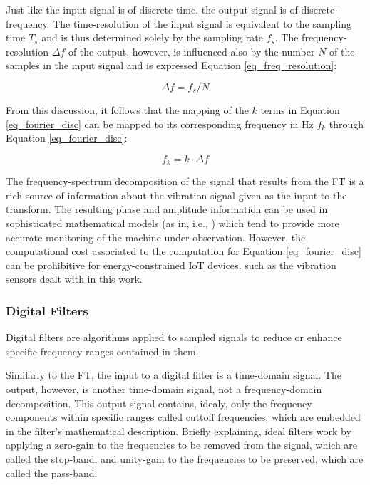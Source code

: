 \documentclass[conference]{IEEEtran}
\begin{document}
Just like the input signal is of discrete-time, the output signal is of discrete-frequency. The time-resolution of the input signal is equivalent to the sampling time $T_{s}$ and is thus determined solely by the sampling rate $f_{s}$. The frequency-resolution $\Delta f$ of the output, however, is influenced also by the number $N$ of the samples in the input signal and is expressed Equation \ref{eq_freq_resolution}:

\begin{equation}
\label{eq_freq_resolution}
\Delta f = f_{s}/N
\end{equation}

From this discussion, it follows that the mapping of the $k$ terms in Equation \ref{eq_fourier_disc} can be mapped to its corresponding frequency in Hz $f_{k}$ through Equation \ref{eq_fourier_disc}:

\begin{equation}
\label{eq_freq_resolution}
f_{k} = k \cdot \Delta f
\end{equation}

The frequency-spectrum decomposition of the signal that results from the FT is a rich source of information about the vibration signal given as the input to the transform. The resulting phase and amplitude information can be used in sophisticated mathematical models (as in, i.e., \cite{wu2017remaining}) which tend to provide more accurate monitoring of the machine under observation. However, the computational cost associated to the computation for Equation \ref{eq_fourier_disc} can be prohibitive for energy-constrained IoT devices, such as the vibration sensors dealt with in this work. 


\subsubsection{Digital Filters}
\label{sec_digital_filters_concept}


Digital filters are algorithms applied to sampled signals to reduce or enhance specific frequency ranges contained in them.

Similarly to the FT, the input to a digital filter is a time-domain signal. The output, however, is another time-domain signal, not a frequency-domain decomposition. This output signal contains, idealy, only the frequency components within specific ranges called cuttoff frequencies, which are embedded in the filter's mathematical description. Briefly explaining, ideal filters work by applying a zero-gain to the frequencies to be removed from the signal, which are called the stop-band, and unity-gain to the frequencies to be preserved, which are called the pass-band.
\end{document}
